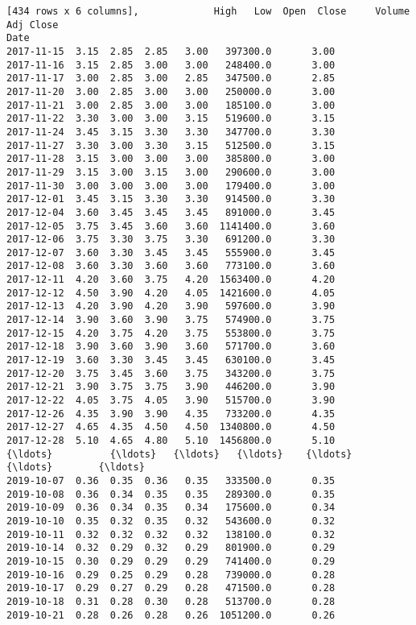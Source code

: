 \documentclass[11pt]{article}
\begin{document}
\begin{Verbatim}[commandchars=\\\{\}]
[434 rows x 6 columns],             High   Low  Open  Close     Volume  Adj Close
Date                                                     
2017-11-15  3.15  2.85  2.85   3.00   397300.0       3.00
2017-11-16  3.15  2.85  3.00   3.00   248400.0       3.00
2017-11-17  3.00  2.85  3.00   2.85   347500.0       2.85
2017-11-20  3.00  2.85  3.00   3.00   250000.0       3.00
2017-11-21  3.00  2.85  3.00   3.00   185100.0       3.00
2017-11-22  3.30  3.00  3.00   3.15   519600.0       3.15
2017-11-24  3.45  3.15  3.30   3.30   347700.0       3.30
2017-11-27  3.30  3.00  3.30   3.15   512500.0       3.15
2017-11-28  3.15  3.00  3.00   3.00   385800.0       3.00
2017-11-29  3.15  3.00  3.15   3.00   290600.0       3.00
2017-11-30  3.00  3.00  3.00   3.00   179400.0       3.00
2017-12-01  3.45  3.15  3.30   3.30   914500.0       3.30
2017-12-04  3.60  3.45  3.45   3.45   891000.0       3.45
2017-12-05  3.75  3.45  3.60   3.60  1141400.0       3.60
2017-12-06  3.75  3.30  3.75   3.30   691200.0       3.30
2017-12-07  3.60  3.30  3.45   3.45   555900.0       3.45
2017-12-08  3.60  3.30  3.60   3.60   773100.0       3.60
2017-12-11  4.20  3.60  3.75   4.20  1563400.0       4.20
2017-12-12  4.50  3.90  4.20   4.05  1421600.0       4.05
2017-12-13  4.20  3.90  4.20   3.90   597600.0       3.90
2017-12-14  3.90  3.60  3.90   3.75   574900.0       3.75
2017-12-15  4.20  3.75  4.20   3.75   553800.0       3.75
2017-12-18  3.90  3.60  3.90   3.60   571700.0       3.60
2017-12-19  3.60  3.30  3.45   3.45   630100.0       3.45
2017-12-20  3.75  3.45  3.60   3.75   343200.0       3.75
2017-12-21  3.90  3.75  3.75   3.90   446200.0       3.90
2017-12-22  4.05  3.75  4.05   3.90   515700.0       3.90
2017-12-26  4.35  3.90  3.90   4.35   733200.0       4.35
2017-12-27  4.65  4.35  4.50   4.50  1340800.0       4.50
2017-12-28  5.10  4.65  4.80   5.10  1456800.0       5.10
{\ldots}          {\ldots}   {\ldots}   {\ldots}    {\ldots}        {\ldots}        {\ldots}
2019-10-07  0.36  0.35  0.36   0.35   333500.0       0.35
2019-10-08  0.36  0.34  0.35   0.35   289300.0       0.35
2019-10-09  0.36  0.34  0.35   0.34   175600.0       0.34
2019-10-10  0.35  0.32  0.35   0.32   543600.0       0.32
2019-10-11  0.32  0.32  0.32   0.32   138100.0       0.32
2019-10-14  0.32  0.29  0.32   0.29   801900.0       0.29
2019-10-15  0.30  0.29  0.29   0.29   741400.0       0.29
2019-10-16  0.29  0.25  0.29   0.28   739000.0       0.28
2019-10-17  0.29  0.27  0.29   0.28   471500.0       0.28
2019-10-18  0.31  0.28  0.30   0.28   513700.0       0.28
2019-10-21  0.28  0.26  0.28   0.26  1051200.0       0.26

\end{Verbatim}
\end{document}

